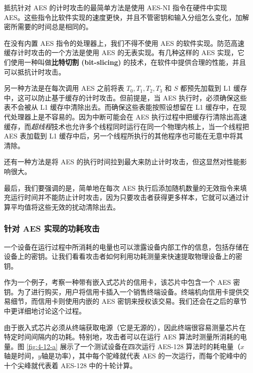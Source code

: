 \begin{snote}[缓和措施。]
抵抗针对 AES 的计时攻击的最简单方法是使用 AES-NI 指令在硬件中实现 AES。这些指令比软件实现的速度更快，并且不管密钥和输入分组怎么变化，加解密所需要的时间总是相同的。

在没有内置 AES 指令的处理器上，我们不得不使用 AES 的软件实现。防范高速缓存计时攻击的一个方法是使用 AES 的无表实现。有几种这样的 AES 实现，它们使用一种叫做\textbf{比特切割 (bit-slicing)} 的技术，在软件中提供合理的性能，并且可以抵抗计时攻击。

另一种方法是在每次调用 AES 之前将表 $T_0,T_1,T_2,T_3$ 和 $S$ 都预先加载到 L1 缓存中，这可以防止基于缓存的计时攻击。但前提是，当 AES 执行时，必须确保这些表不会被从 L1 缓存中清除出去。而确保这些表能按照设想留在 L1 缓存中，在现代处理器上是不容易的。因为中断可能会在 AES 执行过程中把缓存行清除出高速缓存，而\emph{超线程}技术也允许多个线程同时运行在同一个物理内核上，当一个线程把 AES 表加载到 L1 缓存中后，另一个线程所执行的其他程序也可能在无意中将其清除。

还有一种方法是将 AES 的执行时间拉到最大来防止计时攻击，但这显然对性能影响很大。

最后，我们要强调的是，简单地在每次 AES 执行后添加随机数量的无效指令来填充运行时间并不能防止计时攻击，因为只要攻击者获得更多样本，它就可以通过计算平均值将这些无效的扰动清除出去。
\end{snote}

\subsubsection{针对 AES 实现的功耗攻击}

一个设备在运行过程中所消耗的电量也可以泄露设备内部工作的信息，包括存储在设备上的密钥。让我们看看攻击者如何利用功耗测量来快速提取物理设备上的密钥。

作为一个例子，考察一种带有嵌入式芯片的信用卡，该芯片中包含一个 AES 密钥。为了进行购买，用户将信用卡插入一个销售终端设备。终端机向信用卡提供交易细节，而信用卡则使用内嵌的 AES 密钥来授权该交易。我们还会在之后的章节中更详细地讨论这个过程。

由于嵌入式芯片必须从终端获取电源（它是无源的），因此终端很容易测量芯片在特定时间间隔内的功耗。特别地，攻击者可以在运行 AES 算法时测量所消耗的电量。图 \ref{fig:4-12-a} 展示了一个测试设备在四次运行 AES-128 算法时的耗电量（$x$轴是时间，$y$轴是功率），其中每个驼峰就代表 AES 的一次运行，而每个驼峰中的十个尖峰就代表着 AES-128 中的十轮计算。

